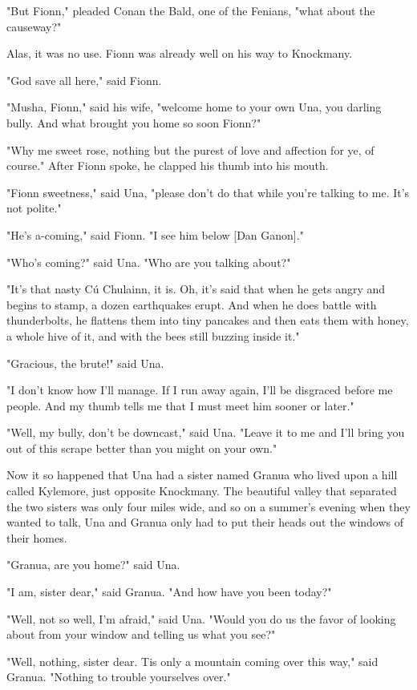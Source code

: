 "But Fionn," pleaded Conan the Bald, one of the Fenians, "what about the causeway?"

Alas, it was no use. Fionn was already well on his way to Knockmany.

"God save all here," said Fionn.

"Musha, Fionn," said his wife, "welcome home to your own Una, you darling bully. And what brought you home so soon Fionn?"

"Why me sweet rose, nothing but the purest of love and affection for ye, of course." After Fionn spoke, he clapped his thumb into his mouth.

"Fionn sweetness," said Una, "please don't do that while you're talking to me. It's not polite."

"He's a-coming," said Fionn. "I see him below [Dan Ganon]."

"Who's coming?" said Una. "Who are you talking about?"

"It's that nasty Cú Chulainn, it is. Oh, it's said that when he gets angry and begins to stamp, a dozen earthquakes erupt. And when he does battle with thunderbolts, he flattens them into tiny pancakes and then eats them with honey, a whole hive of it, and with the bees still buzzing inside it."

"Gracious, the brute!" said Una.

"I don't know how I'll manage. If I run away again, I'll be disgraced before me people. And my thumb tells me that I must meet him sooner or later."

"Well, my bully, don't be downcast," said Una. "Leave it to me and I'll bring you out of this scrape better than you might on your own."

Now it so happened that Una had a sister named Granua who lived upon a hill called Kylemore, just opposite Knockmany. The beautiful valley that separated the two sisters was only four miles wide, and so on a summer's evening when they wanted to talk, Una and Granua only had to put their heads out the windows of their homes.

"Granua, are you home?" said Una.

"I am, sister dear," said Granua. "And how have you been today?"

"Well, not so well, I'm afraid," said Una. "Would you do us the favor of looking about from your window and telling us what you see?"

"Well, nothing, sister dear. Tis only a mountain coming over this way," said Granua. "Nothing to trouble yourselves over."

